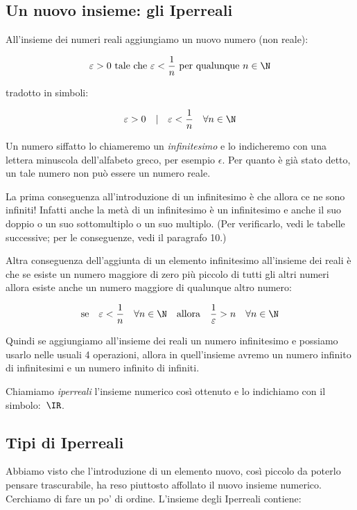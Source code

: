 \subsection{Un nuovo insieme: gli Iperreali}
\label{subsec:insnum_iperreali}

All'insieme dei numeri reali aggiungiamo un nuovo numero (non reale):

\[\varepsilon > 0 \text{ tale che } 
\varepsilon < \frac{1}{n} \text{ per qualunque } n \in \N\]

tradotto in simboli:

\[\varepsilon > 0 \quad | \quad \varepsilon < \frac{1}{n} \quad \forall n \in 
\N\]

Un numero siffatto lo chiameremo un \emph{infinitesimo} e lo indicheremo 
con una lettera minuscola dell'alfabeto greco, per esempio $\epsilon$.
Per quanto è già stato detto, un tale numero non può essere un numero
reale. 

La prima conseguenza all'introduzione di un infinitesimo è che allora ce ne 
sono infiniti! Infatti anche la metà di un infinitesimo è un infinitesimo e 
anche il suo doppio o un suo sottomultiplo o un suo multiplo. (Per 
verificarlo,
vedi le tabelle successive; per le conseguenze, vedi il paragrafo 10.) 

Altra conseguenza dell'aggiunta di un elemento infinitesimo all'insieme dei 
reali è che se esiste un numero maggiore di zero più piccolo di tutti gli 
altri 
numeri allora esiste anche un numero maggiore di qualunque altro numero:

\[\text{se} \quad \varepsilon < \frac{1}{n} \quad \forall n \in \N 
\quad \text{allora} \quad \frac{1}{\varepsilon} > n \quad \forall n 
\in \N\]

Quindi se aggiungiamo all'insieme dei reali un numero infinitesimo e possiamo 
usarlo nelle usuali 4 operazioni, allora in quell'insieme avremo un 
numero infinito di infinitesimi e un numero infinito di infiniti.

Chiamiamo \emph{iperreali} l'insieme numerico così ottenuto e lo indichiamo 
con 
il simbolo:~$\IR$.

\subsection{Tipi di Iperreali}
\label{subsec:insnum_iperreali}

Abbiamo visto che l'introduzione di un elemento nuovo, così piccolo
da poterlo pensare trascurabile, ha 
reso piuttosto affollato il nuovo insieme numerico. Cerchiamo di fare un po' 
di ordine. L'insieme degli Iperreali contiene:

